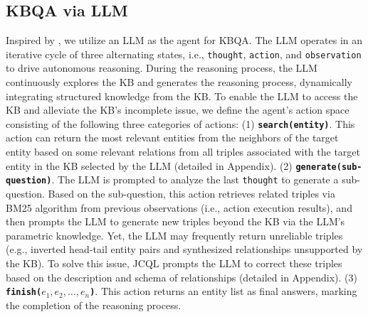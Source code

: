 \documentclass[11pt]{article}
\begin{document}
\subsection{KBQA via LLM} \label{sec:3.2}
Inspired by \cite{sun2023thinkongraph}, we utilize an LLM as the agent for KBQA. The LLM operates in an iterative cycle of three alternating states, i.e., \texttt{thought}, \texttt{action}, and \texttt{observation} to drive autonomous reasoning. During the reasoning process, the LLM continuously explores the KB and generates the reasoning process, dynamically integrating structured knowledge from the KB. To enable the LLM to access the KB and alleviate the KB's incomplete issue, we define the agent's action space consisting of the following three categories of actions: (1) \textbf{\texttt{search(entity)}}. This action can return the most relevant entities from the neighbors of the target entity based on some relevant relations from all triples associated with the target entity in the KB selected by the LLM (detailed in Appendix). (2) \textbf{\texttt{generate(sub-question)}}. 
The LLM is prompted to analyze the last \texttt{thought} to generate a sub-question. 
Based on the sub-question, this action retrieves related triples via BM25 algorithm \cite{robertson2009} from previous observations (i.e., action execution results), and then prompts the LLM to generate new triples beyond the KB via the LLM's parametric knowledge. Yet, the LLM may frequently return unreliable triples (e.g., inverted head-tail entity pairs and synthesized relationships unsupported by the KB). To solve this issue, JCQL prompts the LLM to correct these triples based on the description and schema of relationships (detailed in Appendix).
 (3) \textbf{\texttt{finish($e_1,e_2,\dots,e_n$)}}. This action returns an entity list as final answers, marking the completion of the reasoning process. 
\end{document}
